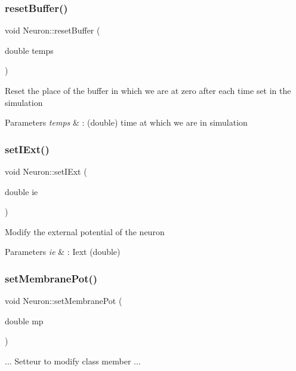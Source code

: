 \subsubsection{\texorpdfstring{reset\+Buffer()}{resetBuffer()}}
{\footnotesize\ttfamily void Neuron\+::reset\+Buffer (\begin{DoxyParamCaption}\item[{double}]{temps }\end{DoxyParamCaption})}

Reset the place of the buffer in which we are at zero after each time set in the simulation 
\begin{DoxyParams}{Parameters}
{\em temps} & \+: (double) time at which we are in simulation \\
\hline
\end{DoxyParams}
\mbox{\label{class_neuron_ad267b5027c8549d85ade592918286b89}} 
\subsubsection{\texorpdfstring{set\+I\+Ext()}{setIExt()}}
{\footnotesize\ttfamily void Neuron\+::set\+I\+Ext (\begin{DoxyParamCaption}\item[{double}]{ie }\end{DoxyParamCaption})}

Modify the external potential of the neuron 
\begin{DoxyParams}{Parameters}
{\em ie} & \+: Iext (double) \\
\hline
\end{DoxyParams}
\mbox{\label{class_neuron_a7613a6978d583cbbe287876144325780}} 
\subsubsection{\texorpdfstring{set\+Membrane\+Pot()}{setMembranePot()}}
{\footnotesize\ttfamily void Neuron\+::set\+Membrane\+Pot (\begin{DoxyParamCaption}\item[{double}]{mp }\end{DoxyParamCaption})}

... Setteur to modify class member ...

